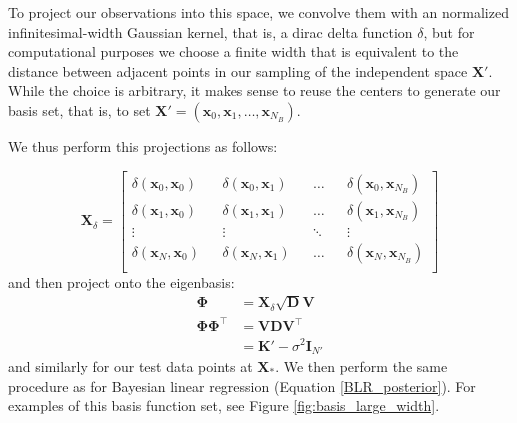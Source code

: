 \documentclass{article}
\begin{document}
To project our observations into this space, we convolve them with an normalized infinitesimal-width Gaussian kernel, that is, a dirac delta function $\delta$, but for computational purposes we choose a finite width that is equivalent to the distance between adjacent points in our sampling of the independent space $\mathbf{X}'$. While the choice is arbitrary, it makes sense to reuse the centers  to generate our basis set, that is, to set $\mathbf{X}'=(\mathbf{x}_0,\mathbf{x}_1,\dots,\mathbf{x}_{N_B})$.

We thus perform this projections as follows: 

\begin{equation}
    \mathbf{X}_\delta =
    \begin{bmatrix}
    \delta(\mathbf{x}_0,\mathbf{x}_0) && \delta(\mathbf{x}_0,\mathbf{x}_1) && \dots && \delta(\mathbf{x}_0,\mathbf{x}_{N_B}) \\
    \delta(\mathbf{x}_1,\mathbf{x}_0) && \delta(\mathbf{x}_1,\mathbf{x}_1) && \dots && \delta(\mathbf{x}_1,\mathbf{x}_{N_B}) \\
    \vdots && \vdots && \ddots && \vdots \\
    \delta(\mathbf{x}_{N},\mathbf{x}_0) && \delta(\mathbf{x}_{N},\mathbf{x}_1) && \dots && \delta(\mathbf{x}_{N},\mathbf{x}_{N_B}) \\
    \end{bmatrix}
\end{equation}
and then project onto the eigenbasis:
\begin{equation}
\begin{split}
    \boldsymbol{\Phi} &= \mathbf{X}_\delta \sqrt{\mathbf{D}}\mathbf{V}\\ \boldsymbol{\Phi} \boldsymbol{\Phi}^\top&=\mathbf{VDV}^\top\\&=\mathbf{K}'-\sigma^2 \mathbf{I}_{N'}
    \end{split}
\end{equation}
and similarly for our test data points at $\mathbf{X}_\ast$. We then perform the same procedure as for Bayesian linear regression (Equation \ref{BLR_posterior}). For examples of this basis function set, see Figure \ref{fig:basis_large_width}.
\end{document}

